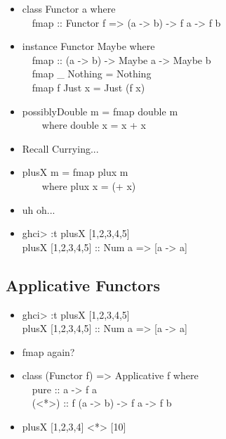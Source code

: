 \documentclass{beamer}                  %
\newcommand{\srule}{
	\rule{\textwidth}{1pt}\\
}
\newlength{\subsecwidth}
\newenvironment{slide}{
	\begin{frame} %
	\settowidth{\subsecwidth}{\insertsubsection} %
	\ifthenelse{\dimtest{\subsecwidth}{<}{1pt}}{ %
		\frametitle{\insertsection\\             %
		\vspace{-1ex}                            %
		\color{fore}\srule                       %
		\par                                     %
		\vspace{-3ex}                            %
		}
	}{                                           %
		\frametitle{\insertsection\ -- \insertsubsection\\ %
		\vspace{-1ex}                            %
		\color{fore}\srule                       %
		\par                                     %
		\vspace{-3ex}                            %
		}
	}
	\Large                                       %
}{
	\end{frame}
}
\begin{document}
\begin{slide}
  \begin{itemize}
    \item
      class Functor a where\\
      ~~fmap :: Functor f => (a -> b) -> f a -> f b
    \item
      instance Functor Maybe where\\
      ~~fmap :: (a -> b) -> Maybe a -> Maybe b\\
      ~~fmap \_ Nothing = Nothing\\
      ~~fmap f Just x = Just (f x)
    \item possiblyDouble m = fmap double m\\
      ~~~~where double x = x + x
  \end{itemize}
\end{slide}

\begin{slide}
  \begin{itemize}
    \item Recall Currying...
    \item plusX m = fmap plux m\\
      ~~~~where plux x = (+ x)
    \item uh oh...
    \item ghci> :t plusX [1,2,3,4,5]\\
      plusX [1,2,3,4,5] :: Num a => [a -> a]
  \end{itemize}
\end{slide}

\subsection{Applicative Functors}

\begin{slide}
  \begin{itemize}
    \item ghci> :t plusX [1,2,3,4,5]\\
      plusX [1,2,3,4,5] :: Num a => [a -> a]
    \item fmap again?
    \item
      class (Functor f) => Applicative f where\\
      ~~pure :: a -> f a\\
      ~~(<*>) :: f (a -> b) -> f a -> f b
    \item
      plusX [1,2,3,4] <*> [10]
  \end{itemize}
\end{slide}
\end{document}
